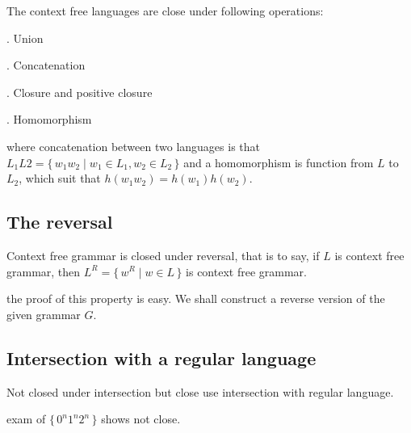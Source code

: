 \documentclass[../main]{subfiles}
\begin{document}
\begin{thm}
\label{The closure properties of context free language}
The context free languages are close under following operations: 

. Union

. Concatenation

. Closure and positive closure

. Homomorphism
\bigskip 

	where concatenation between two languages is that \(L_1 L 2 = \{ \, w_1 w_2 \mid w_1 \in L_1 , w_2 \in L_2 \,\}\) and a 
	homomorphism is function from \( L\) to \(L_2\), which suit that \( h ( w_1 w_2 ) = h (w_1) h(w_2)\).  
\end{thm}

\subsection{The reversal}
Context free grammar is closed under reversal, that is to say, if \(L\) is context free grammar, then
\( L ^{R} = \{\, w^{R} \mid w \in L \,\}\) is context free grammar.

\medskip 
the proof of this property is easy. We shall construct a reverse version of the given grammar \(G\).

\subsection{Intersection with a regular language}
Not closed under intersection but close use intersection with 
regular language.

exam of \(\{ \, 0 ^{n} 1 ^{n} 2 ^{n} \,\}\) shows not close.
\end{document}
